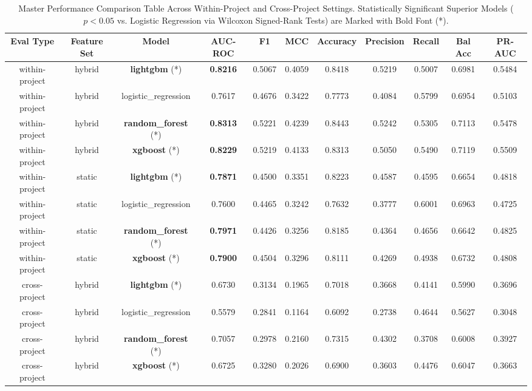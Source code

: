 \begin{table}[t]
\centering
\caption{Master Performance Comparison Table Across Within-Project and Cross-Project Settings. Statistically Significant Superior Models ($p < 0.05$ vs. Logistic Regression via Wilcoxon Signed-Rank Tests) are Marked with Bold Font (*).}
\label{tab:master_results}
\begin{tabular}{ccccccccccc}
\toprule
\textbf{Eval Type} & \textbf{Feature Set} & \textbf{Model} & \textbf{AUC-ROC} & \textbf{F1} & \textbf{MCC} & \textbf{Accuracy} & \textbf{Precision} & \textbf{Recall} & \textbf{Bal Acc} & \textbf{PR-AUC} \\
\midrule
within-project & hybrid & \textbf{lightgbm} (*) & \textbf{0.8216} & 0.5067 & 0.4059 & 0.8418 & 0.5219 & 0.5007 & 0.6981 & 0.5484 \\
within-project & hybrid & logistic_regression & 0.7617 & 0.4676 & 0.3422 & 0.7773 & 0.4084 & 0.5799 & 0.6954 & 0.5103 \\
within-project & hybrid & \textbf{random_forest} (*) & \textbf{0.8313} & 0.5221 & 0.4239 & 0.8443 & 0.5242 & 0.5305 & 0.7113 & 0.5478 \\
within-project & hybrid & \textbf{xgboost} (*) & \textbf{0.8229} & 0.5219 & 0.4133 & 0.8313 & 0.5050 & 0.5490 & 0.7119 & 0.5509 \\
within-project & static & \textbf{lightgbm} (*) & \textbf{0.7871} & 0.4500 & 0.3351 & 0.8223 & 0.4587 & 0.4595 & 0.6654 & 0.4818 \\
within-project & static & logistic_regression & 0.7600 & 0.4465 & 0.3242 & 0.7632 & 0.3777 & 0.6001 & 0.6963 & 0.4725 \\
within-project & static & \textbf{random_forest} (*) & \textbf{0.7971} & 0.4426 & 0.3256 & 0.8185 & 0.4364 & 0.4656 & 0.6642 & 0.4825 \\
within-project & static & \textbf{xgboost} (*) & \textbf{0.7900} & 0.4504 & 0.3296 & 0.8111 & 0.4269 & 0.4938 & 0.6732 & 0.4808 \\
cross-project & hybrid & \textbf{lightgbm} (*) & 0.6730 & 0.3134 & 0.1965 & 0.7018 & 0.3668 & 0.4141 & 0.5990 & 0.3696 \\
cross-project & hybrid & logistic_regression & 0.5579 & 0.2841 & 0.1164 & 0.6092 & 0.2738 & 0.4644 & 0.5627 & 0.3048 \\
cross-project & hybrid & \textbf{random_forest} (*) & 0.7057 & 0.2978 & 0.2160 & 0.7315 & 0.4302 & 0.3708 & 0.6008 & 0.3927 \\
cross-project & hybrid & \textbf{xgboost} (*) & 0.6725 & 0.3280 & 0.2026 & 0.6900 & 0.3603 & 0.4476 & 0.6047 & 0.3663 \\

\end{tabular}
\end{table}
